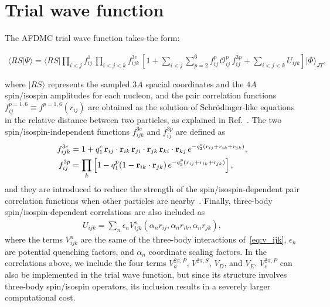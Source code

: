 \documentclass[aps,prc,twocolumn,superscriptaddress,floatfix]{revtex4-1}
\begin{document}
\section{Trial wave function}
\label{sec:wf}
The AFDMC trial wave function takes the form:
\begin{widetext}
\begin{align}
\langle RS|\Psi\rangle=\langle RS|\prod_{i<j}f^1_{ij}\,\prod_{i<j<k}f^{3c}_{ijk}\,
\left[1+\sum_{i<j}\sum_{p=2}^6 f^p_{ij}\,\mathcal O_{ij}^p\, f_{ij}^{3p}
+\sum_{i<j<k}U_{ijk}\right]|\Phi\rangle_{JT} ,
\label{eq:psi}
\end{align}
\end{widetext}
where $|RS\rangle$ represents the sampled $3A$ spacial coordinates and the $4A$ spin/isospin amplitudes
for each nucleon, and the pair correlation functions $f^{p=1,6}_{ij}\equiv f^{p=1,6}(r_{ij})$ are obtained as the solution
of Schr\"odinger-like equations in the relative distance between two particles, as explained in Ref.~\cite{Carlson:2015}. 
The two spin/isospin-independent functions $f^{3c}_{ijk}$ and $f^{3p}_{ij}$ are defined as
\begin{align}
f^{3c}_{ijk}&=1+q_1^c\,\vb{r}_{ij}\cdot\vb{r}_{ik}\,\vb{r}_{ji}\cdot\vb{r}_{jk}\,
\vb{r}_{ki}\cdot\vb{r}_{kj}\,e^{-q_2^c(r_{ij}+r_{ik}+r_{jk})} ,
\nonumber \\
f_{ij}^{3p}&=\prod_k\left[1-q_1^p(1-\vb{r}_{ik}\cdot\vb{r}_{jk})\,e^{-q_2^p(r_{ij}+r_{ik}+r_{jk})}\right] ,
\end{align}
and they are introduced to reduce the strength of the spin/isospin-dependent pair correlation functions when 
other particles are nearby~\cite{Pudliner:1997}.
Finally, three-body spin/isospin-dependent correlations are also included as 
\begin{align}
U_{ijk}=\sum_n \epsilon_n V_{ijk}^n(\alpha_n r_{ij},\alpha_n r_{ik},\alpha_n r_{jk}) ,
\end{align}
where the terms $V^n_{ijk}$ are the same of the three-body interactions of~\cref{eq:v_ijk}, 
$\epsilon_n$ are potential quenching factors, and $\alpha_n$ coordinate scaling factors.
In the correlations above, we include the four terms $V_a^{2\pi,P}$, $V^{2\pi,S}$,
$V_D$, and $V_E$. $V_c^{2\pi,P}$ can also be implemented in the trial wave function,
but since its structure involves three-body spin/isospin operators, its inclusion 
results in a severely larger computational cost.
\end{document}
